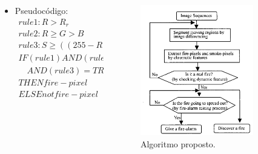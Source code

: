 \documentclass{beamer}
\begin{document}
\begin{frame}{}
\begin{columns}
    \begin{column}{0.50\textwidth}
		\begin{itemize}
			\item Pseudocódigo:
			\begin{gather}
				rule 1: R>R_r \\
				rule 2: R \geq G > B \\
				rule 3: S \geq ((255-R)*S_t/R_t) \\
				IF (rule 1) AND (rule 2) \\
				\quad AND (rule 3) = TRUE \\
				THEN fire-pixel \\
				ELSE not fire-pixel 
			\end{gather} 
		\end{itemize}
		
    \end{column}

    \begin{column}{0.5\textwidth}
		\begin{figure}[H]
		    \centering
		    \begin{center}
		    \includegraphics[width=0.8\textwidth]{img/fig5-artigo1.png}
		  \caption{Algoritmo proposto.}
		    \label{fig:sar}
		  \end{center}
		\end{figure}
    \end{column}
\end{columns}
\end{frame}
\end{document}
